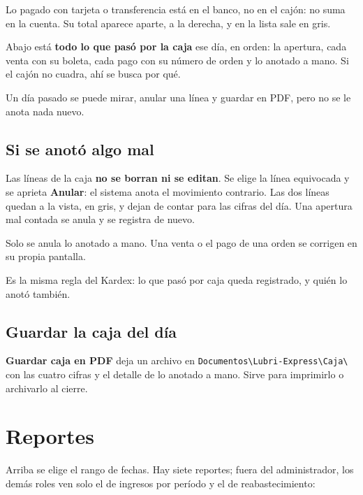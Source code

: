 \documentclass[11pt,a4paper]{article}
\begin{document}
Lo pagado con tarjeta o transferencia está en el banco, no en el cajón: no suma
en la cuenta. Su total aparece aparte, a la derecha, y en la lista sale en gris.

Abajo está \textbf{todo lo que pasó por la caja} ese día, en orden: la apertura,
cada venta con su boleta, cada pago con su número de orden y lo anotado a mano.
Si el cajón no cuadra, ahí se busca por qué.

Un día pasado se puede mirar, anular una línea y guardar en PDF, pero no se le
anota nada nuevo.

\subsection{Si se anotó algo mal}

Las líneas de la caja \textbf{no se borran ni se editan}. Se elige la línea
equivocada y se aprieta \textbf{Anular}: el sistema anota el movimiento
contrario. Las dos líneas quedan a la vista, en gris, y dejan de contar para las
cifras del día. Una apertura mal contada se anula y se registra de nuevo.

Solo se anula lo anotado a mano. Una venta o el pago de una orden se corrigen en
su propia pantalla.

Es la misma regla del Kardex: lo que pasó por caja queda registrado, y quién lo
anotó también.

\subsection{Guardar la caja del día}

\textbf{Guardar caja en PDF} deja un archivo en
\texttt{Documentos\textbackslash Lubri-Express\textbackslash Caja\textbackslash}
con las cuatro cifras y el detalle de lo anotado a mano. Sirve para imprimirlo o
archivarlo al cierre.

\section{Reportes}


Arriba se elige el rango de fechas. Hay siete reportes; fuera del
administrador, los demás roles ven solo el de ingresos por período y el de
reabastecimiento:
\end{document}

